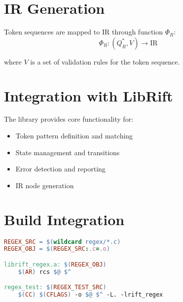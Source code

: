 \documentclass{article}
\begin{document}
\section{IR Generation}
Token sequences are mapped to IR through function $\Phi_R$:
\[
\Phi_R: (Q_R^*, V) \rightarrow \text{IR}
\]

where $V$ is a set of validation rules for the token sequence.

\section{Integration with LibRift}
The library provides core functionality for:
\begin{itemize}
\item Token pattern definition and matching
\item State management and transitions
\item Error detection and reporting
\item IR node generation
\end{itemize}

\section{Build Integration}
\begin{lstlisting}[language=Makefile]
REGEX_SRC = $(wildcard regex/*.c)
REGEX_OBJ = $(REGEX_SRC:.c=.o)

librift_regex.a: $(REGEX_OBJ)
    $(AR) rcs $@ $^

regex_test: $(REGEX_TEST_SRC)
    $(CC) $(CFLAGS) -o $@ $^ -L. -lrift_regex
\end{lstlisting}
\end{document}
